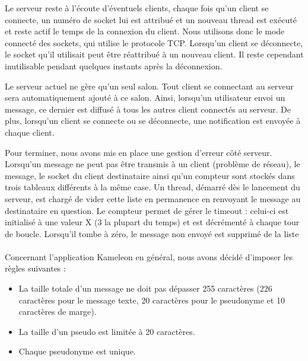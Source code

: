         Le serveur reste à l'écoute d'éventuels clients, chaque fois qu'un client se connecte, un numéro de socket lui est attribué et un nouveau thread est exécuté et reste actif le temps de la connexion du client. Nous utilisons donc le mode connecté des sockets, qui utilise le protocole TCP. Lorsqu'un client se déconnecte, le socket qu'il utilisait peut être réattribué à un nouveau client. Il reste cependant inutilisable pendant quelques instants après la déconnexion.
        
        Le serveur actuel ne gère qu'un seul salon. Tout client se connectant au serveur sera automatiquement ajouté à ce salon. Ainsi, lorsqu'un utilisateur envoi un message, ce dernier est diffusé à tous les autres client connectés au serveur. De plus, lorsqu'un client se connecte ou se déconnecte, une notification est envoyée à chaque client.
        
        Pour terminer, nous avons mis en place une gestion d'erreur côté serveur. Lorsqu'un message ne peut pas être transmis à un client (problème de réseau), le message, le socket du client destinataire ainsi qu'un compteur sont stockés dans trois tableaux différents à la même case. Un thread, démarré dès le lancement du serveur, est chargé de vider cette liste en permanence en renvoyant le message au destinataire en question. Le compteur permet de gérer le timeout : celui-ci est initialisé à une valeur X (3 la plupart du temps) et est décrémenté à chaque tour de boucle. Lorsqu'il tombe à zéro, le message non envoyé est supprimé de la liste
        
        \paragraph{}
        Concernant l'application Kameleon en général, nous avons décidé d'imposer les règles suivantes : 
        \begin{itemize}
            \item La taille totale d'un message ne doit pas dépasser 255 caractères (226 caractères pour le message texte, 20 caractères pour le pseudonyme et 10 caractères de marge).
            \item La taille d'un pseudo est limitée à 20 caractères.
            \item Chaque pseudonyme est unique.
        \end{itemize}
        
